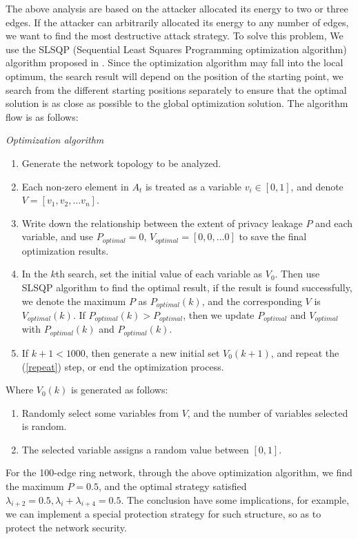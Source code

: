\documentclass[10pt,journal,compsoc]{IEEEtran}
\begin{document}
The above analysis are based on the attacker allocated its energy to two or three edges. If the attacker can arbitrarily allocated its energy to any number of edges, we want to find the most destructive attack strategy. To solve this problem, We use the SLSQP (Sequential Least Squares Programming optimization algorithm) algorithm proposed in \cite{Kraft1994Algorithm}. Since the optimization algorithm may fall into the local optimum, the search result will depend on the position of the starting point, we search from the different starting positions separately to ensure that the optimal solution is as close as possible to the global optimization solution. The algorithm flow is as follows:
\begin{algorithm}[h]
\caption{\emph{Optimization algorithm}}
\begin{enumerate}[1)]
\item Generate the network topology to be analyzed.
\item Each non-zero element in $A_t$ is treated as a variable $v_{i}\in[0,1]$, and denote $V = [v_{1},v_{2},...v_{n}]$.
\item Write down the relationship between the extent of privacy leakage $P$ and each variable, and use $P_{optimal}=0$, $V_{optimal}=[0,0,...0]$ to save the final optimization results.
\item In the $k$th search, set the initial value of each variable as $V_{0}$. Then use SLSQP algorithm to find the optimal result, if the result is found successfully, we denote the maximum $P$ as $P_{optimal}(k)$, and the corresponding $V$ is $V_{optimal}(k)$. If $P_{optimal}(k)>P_{optimal}$, then we update $P_{optimal}$ and $V_{optimal}$ with $P_{optimal}(k)$ and $P_{optimal}(k)$.\label{repeat}
\item If $k+1 < 1000$, then generate a new initial set $V_{0}(k+1)$, and repeat the (\ref{repeat}) step, or end the optimization process.
\end{enumerate}
Where $V_{0}(k)$ is generated as follows:
\begin{enumerate}[1)]
\item Randomly select some variables from $V$, and the number of variables selected is random.
\item The selected variable assigns a random value between $[0,1]$.
\end{enumerate}
\end{algorithm}

For the 100-edge ring network, through the above optimization algorithm, we find the maximum $P = 0.5$, and the optimal strategy satisfied $\lambda_{i+2}=0.5,\lambda_{i}+\lambda_{i+4}=0.5$. The conclusion have some implications, for example, we can implement a special protection strategy for such structure, so as to protect the network security.
\end{document}
